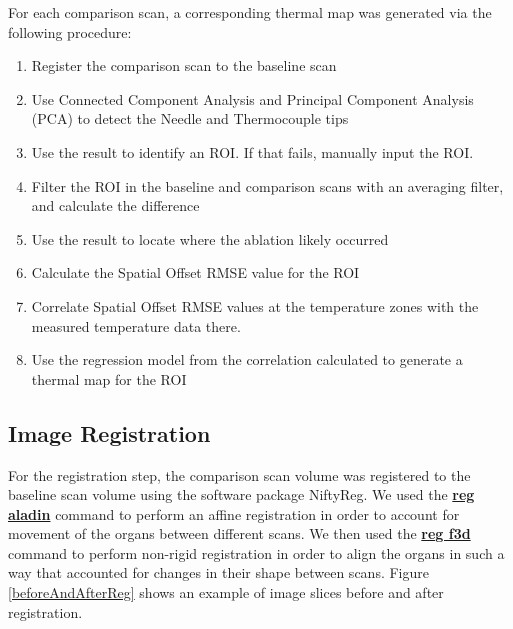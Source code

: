 \documentclass[]{spie}  %
\begin{document}
For each comparison scan, a corresponding thermal map was generated via the following procedure:
\begin{enumerate}
\item Register the comparison scan to the baseline scan
\item Use Connected Component Analysis and Principal Component Analysis (PCA) to detect the Needle and Thermocouple tips
\item Use the result to identify an ROI. If that fails, manually input the ROI.
\item Filter the ROI in the baseline and comparison scans with an averaging filter, and calculate the difference
\item Use the result to locate where the ablation likely occurred
\item Calculate the Spatial Offset RMSE value for the ROI
\item Correlate Spatial Offset RMSE values at the temperature zones with the measured temperature data there. 
\item Use the regression model from the correlation calculated to generate a thermal map for the ROI
\end{enumerate}


\subsection{Image Registration}

For the registration step, the comparison scan volume was registered to the baseline scan volume using the software package NiftyReg. We used the \textbf{\href{http://cmictig.cs.ucl.ac.uk/wiki/index.php/Reg_aladin}{reg aladin}} command to perform an affine registration\cite{Ourselin01} in order to account for movement of the organs between different scans. We then used the \textbf{\href{http://cmictig.cs.ucl.ac.uk/wiki/index.php/Reg_f3d}{reg f3d}} command to perform non-rigid registration\cite{Modat10} in order to align the organs in such a way that accounted for changes in their shape between scans. Figure \ref{beforeAndAfterReg} shows an example of image slices before and after registration. 
\end{document}
